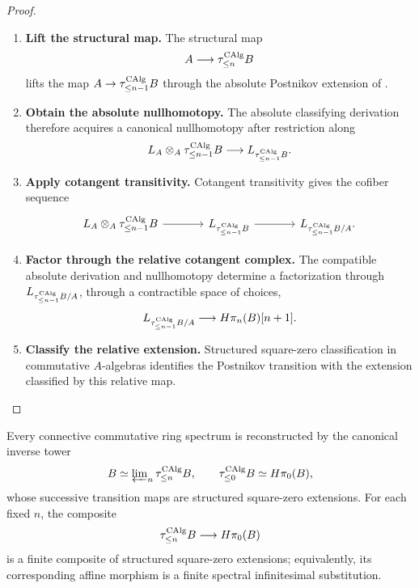 \begin{proof}
\leavevmode
\begin{enumerate}[label=\textup{(\arabic*)}]
    \item \textbf{Lift the structural map.}
    The structural map
    \[
        A\longrightarrow\tau_{\leq n}^{\operatorname{CAlg}}B
    \]
    lifts the map \(A\to\tau_{\leq n-1}^{\operatorname{CAlg}}B\) through the absolute Postnikov
    extension of .
    \item \textbf{Obtain the absolute nullhomotopy.}
    The absolute
    classifying derivation therefore acquires a canonical nullhomotopy after
    restriction along
    \[
        L_A\otimes_A\tau_{\leq n-1}^{\operatorname{CAlg}}B
        \longrightarrow
        L_{\tau_{\leq n-1}^{\operatorname{CAlg}}B}.
    \]
    \item \textbf{Apply cotangent transitivity.}
    Cotangent transitivity gives the cofiber sequence
    \[
    \begin{tikzcd}[column sep=large]
        L_A\otimes_A\tau_{\leq n-1}^{\CAlg}B
            \arrow[r]
            &
        L_{\tau_{\leq n-1}^{\CAlg}B}
            \arrow[r]
            &
        L_{\tau_{\leq n-1}^{\CAlg}B/A}.
    \end{tikzcd}
    \]
    \item \textbf{Factor through the relative cotangent complex.}
    The compatible absolute derivation and nullhomotopy determine a factorization
    through \(L_{\tau_{\leq n-1}^{\operatorname{CAlg}}B/A}\), through a contractible space of choices,
    \[
        L_{\tau_{\leq n-1}^{\operatorname{CAlg}}B/A}
        \longrightarrow
        H\pi_n(B)[n+1].
    \]
    \item \textbf{Classify the relative extension.}
    Structured square-zero classification in commutative \(A\)-algebras identifies
    the Postnikov transition with the extension classified by this relative map.
\end{enumerate}
\end{proof}

\begin{corollary}
\label{cor:infinitesimal-postnikov-reconstruction}
Every connective commutative ring spectrum is reconstructed by the canonical
inverse tower
\[
    B
    \simeq
    \varprojlim\nolimits_n\tau_{\leq n}^{\operatorname{CAlg}}B,
    \qquad
    \tau_{\leq0}^{\operatorname{CAlg}}B\simeq H\pi_0(B),
\]
whose successive transition maps are structured square-zero extensions. For
each fixed \(n\), the composite
\[
    \tau_{\leq n}^{\operatorname{CAlg}}B\longrightarrow H\pi_0(B)
\]
is a finite composite of structured square-zero extensions; equivalently, its
corresponding affine morphism is a finite spectral infinitesimal substitution.
\end{corollary}


